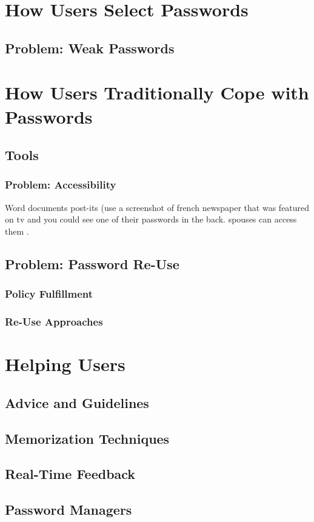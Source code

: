 \section{How Users Select Passwords}
	\subsection{Problem: Weak Passwords}
	
\section{How Users Traditionally Cope with Passwords}
	\subsection{Tools}
		\subsubsection{Problem: Accessibility}
Word documents post-its (use a screenshot of french newspaper that was featured on tv and you could see one of their passwords in the back. spouses can access them .

	\subsection{Problem: Password Re-Use}
		\subsubsection{Policy Fulfillment}
		\subsubsection{Re-Use Approaches}

\section{Helping Users}
	\subsection{Advice and Guidelines}
	\subsection{Memorization Techniques}
	\subsection{Real-Time Feedback}
	\subsection{Password Managers}
